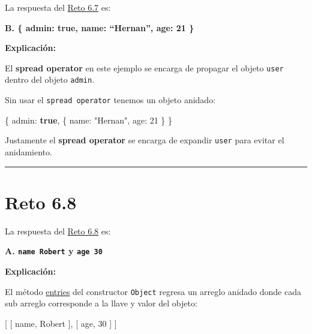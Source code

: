 \documentclass[
  letterpaper,
  DIV=11,
  numbers=noendperiod]{scrreprt}
\newenvironment{Shaded}{\begin{snugshade}}{\end{snugshade}}
\newcommand{\DataTypeTok}[1]{\textcolor[rgb]{0.68,0.00,0.00}{#1}}
\newcommand{\DecValTok}[1]{\textcolor[rgb]{0.68,0.00,0.00}{#1}}
\newcommand{\KeywordTok}[1]{\textcolor[rgb]{0.00,0.23,0.31}{\textbf{#1}}}
\newcommand{\NormalTok}[1]{\textcolor[rgb]{0.00,0.23,0.31}{#1}}
\newcommand{\OperatorTok}[1]{\textcolor[rgb]{0.37,0.37,0.37}{#1}}
\newcommand{\StringTok}[1]{\textcolor[rgb]{0.13,0.47,0.30}{#1}}
\begin{document}
La respuesta del \hyperref[sec-cap6-reto7]{Reto 6.7} es:

\textbf{B. \{ admin: true, name: ``Hernan'', age: 21 \}}

\textbf{Explicación:}

El \textbf{spread operator} en este ejemplo se encarga de propagar el
objeto \texttt{user} dentro del objeto \texttt{admin}.

Sin usar el \texttt{spread\ operator} tenemos un objeto anidado:

\begin{Shaded}
\begin{Highlighting}[]
\NormalTok{\{ }\DataTypeTok{admin}\OperatorTok{:} \KeywordTok{true}\OperatorTok{,}\NormalTok{ \{ }\DataTypeTok{name}\OperatorTok{:} \StringTok{"Hernan"}\OperatorTok{,} \DataTypeTok{age}\OperatorTok{:} \DecValTok{21}\NormalTok{ \} \}}
\end{Highlighting}
\end{Shaded}

Justamente el \textbf{spread operator} se encarga de expandir
\texttt{user} para evitar el anidamiento.

\begin{center}\rule{0.5\linewidth}{0.5pt}\end{center}

\section{Reto 6.8}\label{sec-sol-cap6-reto8}

La respuesta del \hyperref[sec-cap6-reto8]{Reto 6.8} es:

\textbf{A. \texttt{name\ Robert} y \texttt{age\ 30}}

\textbf{Explicación:}

El método \hyperref[glos-entries]{entries} del constructor
\texttt{Object} regresa un arreglo anidado donde cada sub arreglo
corresponde a la llave y valor del objeto:

\begin{Shaded}
\begin{Highlighting}[]
\NormalTok{[ [ }\StringTok{\textquotesingle{}name\textquotesingle{}}\OperatorTok{,} \StringTok{\textquotesingle{}Robert\textquotesingle{}}\NormalTok{ ]}\OperatorTok{,}\NormalTok{ [ }\StringTok{\textquotesingle{}age\textquotesingle{}}\OperatorTok{,} \DecValTok{30}\NormalTok{ ] ]}
\end{Highlighting}
\end{Shaded}
\end{document}
